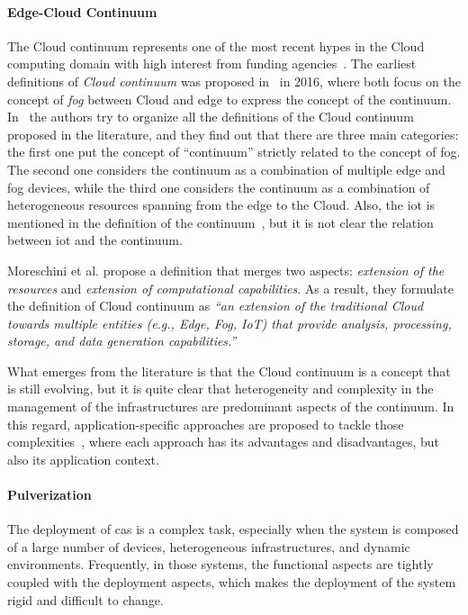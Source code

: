 \documentclass[12pt,a4paper]{article}
\begin{document}
\paragraph{Edge-Cloud Continuum}
The Cloud continuum represents one of the most recent hypes in the Cloud computing domain with high interest from funding agencies~\cite{ict-40-2020, horizon-cl4-2022-data-01-02}.
%
The earliest definitions of \emph{Cloud continuum} was proposed in~\cite{DBLP:journals/corr/GuptaNCG16, DBLP:journals/iotj/ChiangZ16} in 2016,
where both focus on the concept of \emph{fog} between Cloud and edge to express the concept of the continuum.
%
In~\cite{DBLP:journals/access/MoreschiniPLNHT22} the authors try to organize all the definitions of the Cloud continuum proposed in the literature,
and they find out that there are three main categories: the first one put the concept of ``continuum'' strictly related to the concept of fog.
%
The second one considers the continuum as a combination of multiple edge and fog devices, 
while the third one considers the continuum as a combination of heterogeneous resources spanning from the edge to the Cloud.
%
Also, the \ac{iot} is mentioned in the definition of the continuum~\cite{DBLP:conf/ucc/SpillnerGBV20, 9116796},
but it is not clear the relation between \ac{iot} and the continuum.

Moreschini et al. propose a definition that merges two aspects: \emph{extension of the resources} and \emph{extension of computational capabilities}.
%
As a result, they formulate the definition of Cloud continuum as \emph{``an extension of the traditional Cloud towards multiple entities (e.g., Edge, Fog, IoT) that provide analysis, processing, storage, and data generation capabilities.''}

What emerges from the literature is that the Cloud continuum is a concept that is still evolving,
but it is quite clear that heterogeneity and complexity in the management of the infrastructures are predominant aspects of the continuum.
%
In this regard,
application-specific approaches are proposed to tackle those complexities~\cite{DBLP:journals/tiot/NehaPSSG22, DBLP:journals/csur/WeisenburgerWS20, DBLP:journals/fi/CasadeiPPVW20},
where each approach has its advantages and disadvantages, but also its application context.

\paragraph{Pulverization}
The deployment of \ac{cas} is a complex task,
especially when the system is composed of a large number of devices,
heterogeneous infrastructures, and dynamic environments.
%
Frequently,
in those systems,
the functional aspects are tightly coupled with the deployment aspects,
which makes the deployment of the system rigid and difficult to change.
\end{document}
